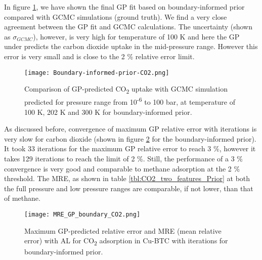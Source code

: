 \documentclass[twoside,twocolumn,9pt]{article}
\begin{document}
In figure \ref{fgr:boundary_co2_uptake}, we have shown the final GP fit based on boundary-informed prior compared with GCMC simulations (ground truth). We find a very close agreement between the GP fit and GCMC calculations. The uncertainty (shown as $\sigma_{GCMC}$), however, is very high for temperature of 100 K and here the GP under predicts the carbon dioxide uptake in the mid-pressure range. However this error is very small and is close to the 2 \% relative error limit.
\begin{figure}[ht]
\centering
  \texttt{[image: Boundary-informed-prior-CO2.png]}
  \caption{Comparison of GP-predicted CO\textsubscript{2} uptake with GCMC simulation predicted for pressure range from 10\textsuperscript{-6} to 100 bar, at temperature of 100 K, 202 K and 300 K for boundary-informed prior.}
  \label{fgr:boundary_co2_uptake}
\end{figure}

As discussed before, convergence of maximum GP relative error with iterations is very slow for carbon dioxide (shown in figure \ref{fgr:boundary-rel-rrmse-CO2} for the boundary-informed prior). It took 33 iterations for the maximum GP relative error to reach 3 \%, however it takes 129 iterations to reach the limit of 2 \%. Still, the performance of a 3 \% convergence is very good and comparable to methane adsorption at the 2 \% threshold. The MRE, as shown in table \ref{tbl:CO2_two_features_Prior} at both the full pressure and low pressure ranges are comparable, if not lower, than that of methane. 
\begin{figure}[ht]
\centering
  \texttt{[image: MRE\_GP\_boundary\_CO2.png]}
  \caption{Maximum GP-predicted relative error and MRE (mean relative error) with AL for CO\textsubscript{2} adsorption in Cu-BTC with iterations for boundary-informed prior.}
  \label{fgr:boundary-rel-rrmse-CO2}
\end{figure}
\end{document}
